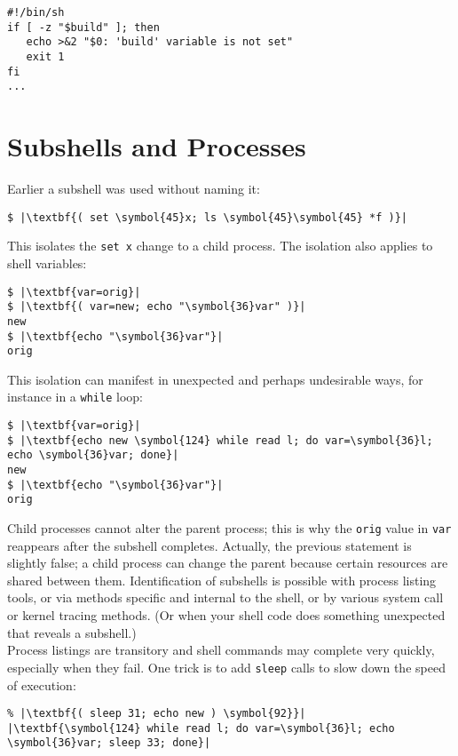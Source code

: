 \documentclass[10pt,a4paper]{article}
\begin{document}
\begin{lstlisting}
#!/bin/sh
if [ -z "$build" ]; then
   echo >&2 "$0: 'build' variable is not set"
   exit 1
fi
...
\end{lstlisting}

\section*{Subshells and Processes}

Earlier a subshell was used without naming it:

\begin{lstlisting}
$ |\textbf{( set \symbol{45}x; ls \symbol{45}\symbol{45} *f )}|
\end{lstlisting}

This isolates the \texttt{set x} change to a child process.
The isolation also applies to shell variables:

\begin{lstlisting}
$ |\textbf{var=orig}|
$ |\textbf{( var=new; echo "\symbol{36}var" )}|
new
$ |\textbf{echo "\symbol{36}var"}|
orig
\end{lstlisting}

This isolation can manifest in unexpected and perhaps undesirable ways,
for instance in a \texttt{while} loop:

\begin{lstlisting}
$ |\textbf{var=orig}|
$ |\textbf{echo new \symbol{124} while read l; do var=\symbol{36}l; echo \symbol{36}var; done}|
new
$ |\textbf{echo "\symbol{36}var"}|
orig
\end{lstlisting}

Child processes cannot alter the parent process; this is why the
\texttt{orig} value in \texttt{var} reappears after the subshell
completes. Actually, the previous statement is slightly false; a child
process can change the parent because certain resources are shared
between them. Identification of subshells is possible with process
listing tools, or via methods specific and internal to the shell, or by
various system call or kernel tracing methods. (Or when your shell code
does something unexpected that reveals a subshell.) \\

Process listings are transitory and shell commands may complete very
quickly, especially when they fail. One trick is to add \texttt{sleep}
calls to slow down the speed of execution:

\begin{lstlisting}
% |\textbf{( sleep 31; echo new ) \symbol{92}}|
|\textbf{\symbol{124} while read l; do var=\symbol{36}l; echo \symbol{36}var; sleep 33; done}|
\end{lstlisting}
\end{document}
